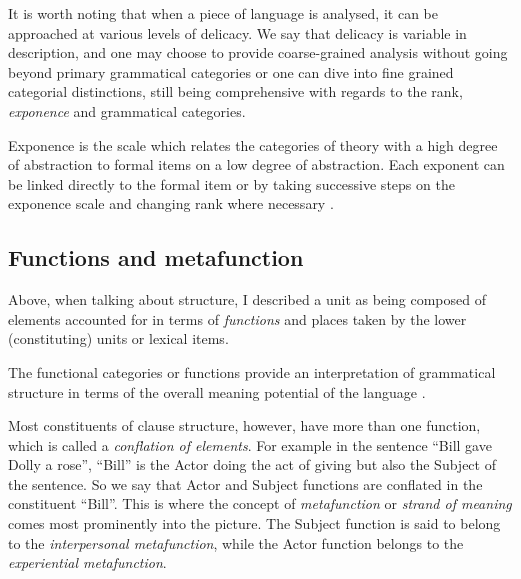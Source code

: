     
    It is worth noting that when a piece of language is analysed, it can be approached at various levels of delicacy. We say that delicacy is variable in description, and one may choose to provide coarse-grained analysis without going beyond primary grammatical categories or one can dive into fine grained categorial distinctions, still being comprehensive with regards to the rank, \textit{exponence} and grammatical categories. 
    
    \begin{definition}[Exponence]\label{def:exponence-sydney}
        Exponence is the scale which relates the categories of theory with a high degree of abstraction to formal items on a low degree of abstraction. Each exponent can be linked directly to the formal item or by taking successive steps on the exponence scale and changing rank where necessary \citet[57]{Halliday2002}.
    \end{definition}
    

\subsection{Functions and metafunction}
\label{sec:functions-metafunctions}
    Above, when talking about structure, I described a unit as being composed of elements accounted for in terms of \textit{functions} and places taken by the lower (constituting) units or lexical items.
    
    \begin{definition}[Function]\label{def:function}
    	The functional categories or functions provide an interpretation of grammatical structure in terms of the overall meaning potential of the language \citep[76]{Halliday2013}.
    \end{definition}
    
    Most constituents of clause structure, however, have more than one function, which is called a \textit{conflation of elements}. For example in the sentence ``Bill gave Dolly a rose'', ``Bill'' is the Actor doing the act of giving but also the Subject of the sentence. So we say that Actor and Subject functions are conflated in the constituent ``Bill''. This is where the concept of \textit{metafunction} or \textit{strand of meaning} comes most prominently into the picture. The Subject function is said to belong to the \textit{interpersonal metafunction}, while the Actor function belongs to the \textit{experiential metafunction}. 
    
